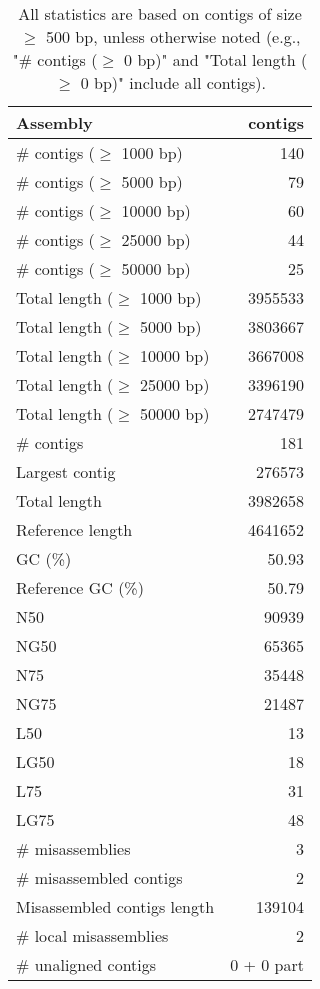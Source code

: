 \documentclass[12pt,a4paper]{article}
\begin{document}
\begin{table}[ht]
\begin{center}
\caption{All statistics are based on contigs of size $\geq$ 500 bp, unless otherwise noted (e.g., "\# contigs ($\geq$ 0 bp)" and "Total length ($\geq$ 0 bp)" include all contigs).}
\begin{tabular}{|l*{1}{|r}|}
\hline
Assembly & contigs \\ \hline
\# contigs ($\geq$ 1000 bp) & 140 \\ \hline
\# contigs ($\geq$ 5000 bp) & 79 \\ \hline
\# contigs ($\geq$ 10000 bp) & 60 \\ \hline
\# contigs ($\geq$ 25000 bp) & 44 \\ \hline
\# contigs ($\geq$ 50000 bp) & 25 \\ \hline
Total length ($\geq$ 1000 bp) & 3955533 \\ \hline
Total length ($\geq$ 5000 bp) & 3803667 \\ \hline
Total length ($\geq$ 10000 bp) & 3667008 \\ \hline
Total length ($\geq$ 25000 bp) & 3396190 \\ \hline
Total length ($\geq$ 50000 bp) & 2747479 \\ \hline
\# contigs & 181 \\ \hline
Largest contig & 276573 \\ \hline
Total length & 3982658 \\ \hline
Reference length & 4641652 \\ \hline
GC (\%) & 50.93 \\ \hline
Reference GC (\%) & 50.79 \\ \hline
N50 & 90939 \\ \hline
NG50 & 65365 \\ \hline
N75 & 35448 \\ \hline
NG75 & 21487 \\ \hline
L50 & 13 \\ \hline
LG50 & 18 \\ \hline
L75 & 31 \\ \hline
LG75 & 48 \\ \hline
\# misassemblies & 3 \\ \hline
\# misassembled contigs & 2 \\ \hline
Misassembled contigs length & 139104 \\ \hline
\# local misassemblies & 2 \\ \hline
\# unaligned contigs & 0 + 0 part \\ \hline

\end{tabular}
\end{center}
\end{table}
\end{document}
